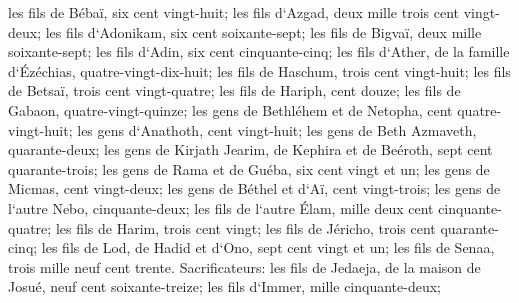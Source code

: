 \verse les fils de Bébaï, six cent vingt-huit; 
\verse les fils d`Azgad, deux mille trois cent vingt-deux; 
\verse les fils d`Adonikam, six cent soixante-sept; 
\verse les fils de Bigvaï, deux mille soixante-sept; 
\verse les fils d`Adin, six cent cinquante-cinq; 
\verse les fils d`Ather, de la famille d`Ézéchias, quatre-vingt-dix-huit; 
\verse les fils de Haschum, trois cent vingt-huit; 
\verse les fils de Betsaï, trois cent vingt-quatre; 
\verse les fils de Hariph, cent douze; 
\verse les fils de Gabaon, quatre-vingt-quinze; 
\verse les gens de Bethléhem et de Netopha, cent quatre-vingt-huit; 
\verse les gens d`Anathoth, cent vingt-huit; 
\verse les gens de Beth Azmaveth, quarante-deux; 
\verse les gens de Kirjath Jearim, de Kephira et de Beéroth, sept cent quarante-trois; 
\verse les gens de Rama et de Guéba, six cent vingt et un; 
\verse les gens de Micmas, cent vingt-deux; 
\verse les gens de Béthel et d`Aï, cent vingt-trois; 
\verse les gens de l`autre Nebo, cinquante-deux; 
\verse les fils de l`autre Élam, mille deux cent cinquante-quatre; 
\verse les fils de Harim, trois cent vingt; 
\verse les fils de Jéricho, trois cent quarante-cinq; 
\verse les fils de Lod, de Hadid et d`Ono, sept cent vingt et un; 
\verse les fils de Senaa, trois mille neuf cent trente. 
\verse Sacrificateurs: les fils de Jedaeja, de la maison de Josué, neuf cent soixante-treize; 
\verse les fils d`Immer, mille cinquante-deux; 
